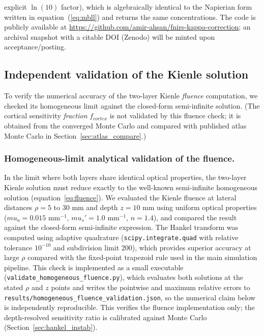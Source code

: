 \documentclass[11pt]{article}
\def\mu{mu}%
\def\mathrm#1{#1}%
\def\,{ }%
\begin{document}
explicit $\ln(10)$ factor), which is algebraically identical to the Napierian form written in equation~(\ref{eq:mbll}) and returns the same concentrations. The code is publicly available at \url{https://github.com/amir-ahsan/fnirs-kappa-correction}; an archival snapshot with a citable DOI (Zenodo) will be minted upon acceptance/posting.

\subsection{Independent validation of the Kienle solution}
\label{sec:validation}

To verify the numerical accuracy of the two-layer Kienle \emph{fluence} computation, we checked its homogeneous limit against the closed-form semi-infinite solution. (The cortical sensitivity \emph{fraction} $f_{\mathrm{cortex}}$ is not validated by this fluence check; it is obtained from the converged Monte Carlo and compared with published atlas Monte Carlo in Section~\ref{sec:atlas_compare}.)

\subsubsection{Homogeneous-limit analytical validation of the fluence.}
In the limit where both layers share identical optical properties, the two-layer Kienle solution must reduce exactly to the well-known semi-infinite homogeneous solution (equation~\ref{eq:fluence}). We evaluated the Kienle fluence at lateral distances $\rho = 5$ to 30\,mm and depth $z = 10$\,mm using uniform optical properties ($\mu_a = 0.015$\,mm$^{-1}$, $\mu_s' = 1.0$\,mm$^{-1}$, $n = 1.4$), and compared the result against the closed-form semi-infinite expression. The Hankel transform was computed using adaptive quadrature (\texttt{scipy.integrate.quad} with relative tolerance $10^{-10}$ and subdivision limit 200), which provides superior accuracy at large $\rho$ compared with the fixed-point trapezoid rule used in the main simulation pipeline. This check is implemented as a small executable (\texttt{validate\_homogeneous\_fluence.py}), which evaluates both solutions at the stated $\rho$ and $z$ points and writes the pointwise and maximum relative errors to \texttt{results/homogeneous\_fluence\_validation.json}, so the numerical claim below is independently reproducible. This verifies the fluence implementation only; the depth-resolved sensitivity ratio is calibrated against Monte Carlo (Section~\ref{sec:hankel_instab}).
\end{document}
